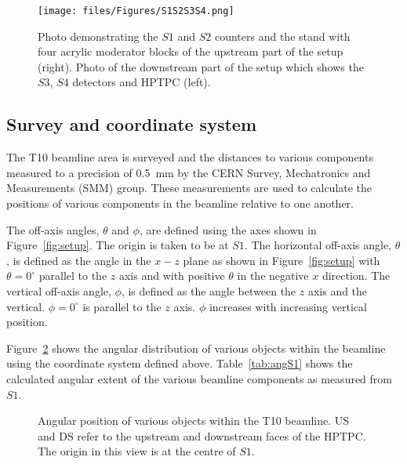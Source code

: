 \begin{figure}[t]
  \centering
  \texttt{[image: files/Figures/S1S2S3S4.png]}
  \caption{Photo demonstrating the $\mathit{S1}$ and $\mathit{S2}$ counters and the stand with four acrylic moderator blocks of the upstream part of the setup (right). Photo of the downstream part of the setup which shows the $\mathit{S3}$, $\mathit{S4}$ detectors and HPTPC (left).}
  \label{fig:modblocks}
\end{figure}

\subsection{Survey and coordinate system}
\label{sec:coord}
The T10 beamline area is surveyed and the distances to various components measured to a precision of 0.5~mm by the CERN Survey, Mechatronics and Measurements (SMM) group.
These measurements are used to calculate the positions of various components in the beamline relative to one another.

The off-axis angles, $\theta$ and $\phi$, are defined using the axes shown in Figure~\ref{fig:setup}.
The origin is taken to be at $\mathit{S1}$.
The horizontal off-axis angle, $\theta$, is defined as the angle in the $x-z$ plane as shown in Figure~\ref{fig:setup} with $\theta = 0^{\circ}$ parallel to the $z$ axis and with positive $\theta$ in the negative $x$ direction.
The vertical off-axis angle, $\phi$, is defined as the angle between the $z$ axis and the vertical.
$\phi = 0^{\circ}$ is parallel to the $z$ axis.
$\phi$ increases with increasing vertical position.

Figure~\ref{fig:angularDistS1} shows the angular distribution of various objects within the beamline using the coordinate system defined above. Table~\ref{tab:angS1} shows the calculated angular extent of the various beamline components as measured from $\mathit{S1}$.

\begin{figure}[ht]
  \begin{adjustbox}{max totalsize={0.7\textwidth}{.5\textheight},center}
    
  \end{adjustbox}
  \caption{Angular position of various objects within the T10 beamline. US and DS refer to the upstream and downstream faces of the HPTPC. The origin in this view is at the centre of $\mathit{S1}$.}
  \label{fig:angularDistS1}
\end{figure}

